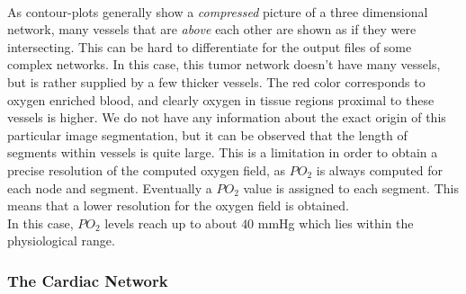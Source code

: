 \\As contour-plots generally show a \emph{compressed} picture of a three dimensional network, many vessels that are \emph{above} each other are shown as if they were intersecting. This can be hard to differentiate for the output files of some complex networks. In this case, this tumor network doesn't have many vessels, but is rather supplied by a few thicker vessels. The red color corresponds to oxygen enriched blood, and clearly oxygen in tissue regions proximal to these vessels is higher. We do not have any information about the exact origin of this particular image segmentation, but it can be observed that the length of segments within vessels is quite large. This is a limitation in order to obtain a precise resolution of the computed oxygen field, as $PO_2$ is always computed for each node and segment. Eventually a $PO_2$ value is assigned to each segment. This means that a lower resolution for the oxygen field is obtained.
\\In this case, $PO_2$ levels reach up to about $40$ mmHg which lies within the physiological range.



\newpage
\subsubsection*{The Cardiac Network}

